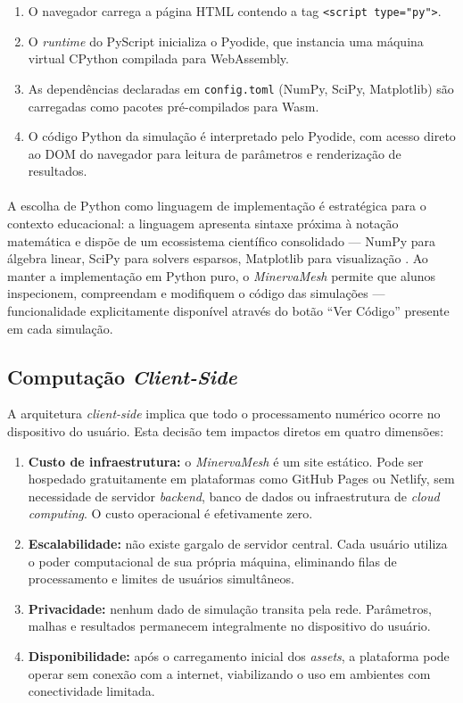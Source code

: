 \begin{enumerate}
    \item O navegador carrega a página HTML contendo a tag \texttt{<script type="py">}.
    \item O \textit{runtime} do PyScript inicializa o Pyodide, que instancia uma máquina virtual CPython compilada para WebAssembly.
    \item As dependências declaradas em \texttt{config.toml} (NumPy, SciPy, Matplotlib) são carregadas como pacotes pré-compilados para Wasm.
    \item O código Python da simulação é interpretado pelo Pyodide, com acesso direto ao DOM do navegador para leitura de parâmetros e renderização de resultados.
\end{enumerate}

\paragraph{}A escolha de Python como linguagem de implementação é estratégica para o contexto educacional: a linguagem apresenta sintaxe próxima à notação matemática e dispõe de um ecossistema científico consolidado --- NumPy para álgebra linear, SciPy para solvers esparsos, Matplotlib para visualização \cite{Harris2020}. Ao manter a implementação em Python puro, o \textit{MinervaMesh} permite que alunos inspecionem, compreendam e modifiquem o código das simulações --- funcionalidade explicitamente disponível através do botão ``Ver Código'' presente em cada simulação.

\subsection{Computação \textit{Client-Side}}
\label{sec:client_side}

A arquitetura \textit{client-side} implica que todo o processamento numérico ocorre no dispositivo do usuário. Esta decisão tem impactos diretos em quatro dimensões:

\begin{enumerate}
    \item \textbf{Custo de infraestrutura:} o \textit{MinervaMesh} é um site estático. Pode ser hospedado gratuitamente em plataformas como GitHub Pages ou Netlify, sem necessidade de servidor \textit{backend}, banco de dados ou infraestrutura de \textit{cloud computing}. O custo operacional é efetivamente zero.
    \item \textbf{Escalabilidade:} não existe gargalo de servidor central. Cada usuário utiliza o poder computacional de sua própria máquina, eliminando filas de processamento e limites de usuários simultâneos.
    \item \textbf{Privacidade:} nenhum dado de simulação transita pela rede. Parâmetros, malhas e resultados permanecem integralmente no dispositivo do usuário.
    \item \textbf{Disponibilidade:} após o carregamento inicial dos \textit{assets}, a plataforma pode operar sem conexão com a internet, viabilizando o uso em ambientes com conectividade limitada.
\end{enumerate}

